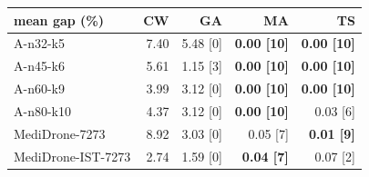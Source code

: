 \begin{tabular}{@{}l r r r r@{}}
\toprule
mean gap (\%)  & CW & \textcolor{gaC}{GA} & \textcolor{maC}{MA} & \textcolor{tsC}{TS} \\
\midrule
A-n32-k5 & 7.40 & 5.48 [0] & \textbf{0.00 [10]} & \textbf{0.00 [10]} \\
A-n45-k6 & 5.61 & 1.15 [3] & \textbf{0.00 [10]} & \textbf{0.00 [10]} \\
A-n60-k9 & 3.99 & 3.12 [0] & \textbf{0.00 [10]} & \textbf{0.00 [10]} \\
A-n80-k10 & 4.37 & 3.12 [0] & \textbf{0.00 [10]} & 0.03 [6] \\
MediDrone-7273 & 8.92 & 3.03 [0] & 0.05 [7] & \textbf{0.01 [9]} \\
MediDrone-IST-7273 & 2.74 & 1.59 [0] & \textbf{0.04 [7]} & 0.07 [2] \\
\bottomrule
\end{tabular}
